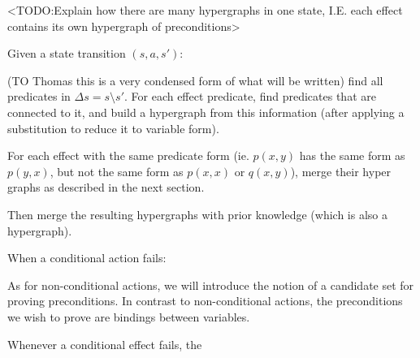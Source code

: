 \documentclass[../Master.tex]{subfiles}
\begin{document}
<TODO:\@ Explain how there are many hypergraphs in one state, I.E. each effect contains its own hypergraph of preconditions>

Given a state transition $(s,a,s')$:

(TO Thomas this is a very condensed form of what will be written)
find all predicates in $\Delta s = s \setminus s'$. For each effect predicate, find predicates that are connected to it, and build a hypergraph from this information (after applying a substitution to reduce it to variable form). 

For each effect with the same predicate form (ie. $p(x,y)$ has the same form as $p(y,x)$, but not the same form as $p(x,x)$ or $q(x,y)$), merge their hyper graphs as described in the next section. 

Then merge the resulting hypergraphs with prior knowledge (which is also a hypergraph).

When a conditional action fails:

As for non-conditional actions, we will introduce the notion of a candidate set for proving preconditions. In contrast to non-conditional actions, the preconditions we wish to prove are bindings between variables. 

Whenever a conditional effect fails, the 
\end{document}
